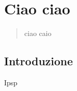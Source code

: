 \documentclass{ipspproceeding}
\begin{document}
\chapter{Ciao ciao}
\begin{abstract}
ciao caio
\end{abstract}
\section{Introduzione}
Ipsp
\end{document}
